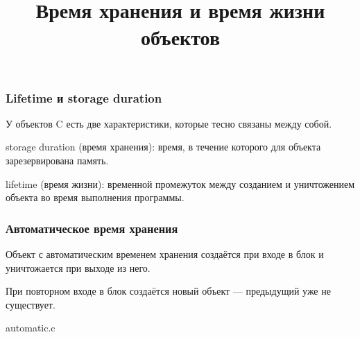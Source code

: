 \documentclass[compress, 8pt, aspectratio=169]{beamer}
\title{Время хранения и время жизни объектов}
\begin{document}
\frame[plain]{\titlepage}

\begin{frame}

    \frametitle{Lifetime и storage duration}

    У объектов C есть две характеристики, которые
    тесно связаны между собой.

    \bigbreak

    \begin{myitemize}

        \item storage duration (время хранения): время, в течение
            которого для объекта зарезервирована память.

        \item lifetime (время жизни): временной промежуток
            между созданием и уничтожением объекта во
            время выполнения программы.

    \end{myitemize}

\end{frame}

\begin{frame}[fragile]

    \frametitle{Автоматическое время хранения}

    \begin{myitemize}

        \item Объект с автоматическим временем хранения
            создаётся при входе в блок
            и уничтожается при выходе из него.

        \item При повторном входе в блок создаётся новый
            объект --- предыдущий уже не существует.

    \end{myitemize}

    \bigbreak

        {automatic.c}

\end{frame}
\end{document}
